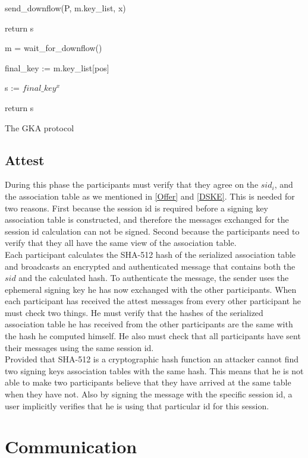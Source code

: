 \documentclass[12pt,titlepage,a4paper]{article}
\begin{document}
{\begin{algorithm}[H]
{{{				send\_downflow(P, m.key\_list, x)

				return s
			}
	}

	m = wait\_for\_downflow()


	final\_key := m.key\_list[pos]

	s := $final\_key^x$

	return s

	}
	\caption{The GKA protocol}
	\label{gka_proto_algo}
\end{algorithm}

\subsection{Attest}

During this phase the participants must verify that they agree on the $sid_i$,
and the association table as we mentioned in \ref{Offer} and \ref{DSKE}.
This is needed for two reasons. First because the session id is required before a signing key association table is constructed, and therefore the messages exchanged for the session id calculation can not be signed.
Second because the participants need to verify that they all have the same view of the association table.\\

Each participant calculates the SHA-512 hash of the serialized association table and broadcasts an encrypted and authenticated message that contains both the $sid$ and the calculated hash.
To authenticate the message, the sender uses the ephemeral signing key he has now exchanged with the other participants.
When each participant has received the attest messages from every other participant he must check two things.
He must verify that the hashes of the serialized association table he has received from the other participants are the same with the hash he computed himself.
He also must check that all participants have sent their messages using the same session id.\\

Provided that SHA-512 is a cryptographic hash function an attacker cannot find two signing keys association tables with the same hash.
This means that he is not able to make two participants believe that they have arrived at the same table when they have not.
Also by signing the message with the specific session id, a user implicitly verifies that he is using that particular id for this session.

\section{Communication}

}
\end{document}
